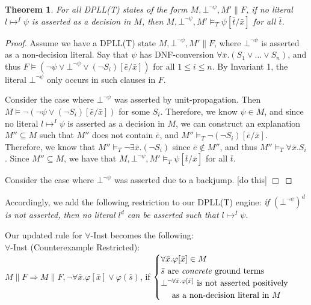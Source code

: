 \documentclass{llncs}
\newtheorem{thm}{Theorem}
\begin{document}
\begin{thm}
For all DPLL(T) states of the form $M, \bot^{\neg \psi}, M' \parallel F$, if no literal $l \mapsto^I \psi$ is asserted as a decision in $M$, then $M, \bot^{\neg \psi}, M' \models_T \psi[\bar{t}/\bar{x}]$ for all $\bar{t}$.
\end{thm}
\begin{proof}
Assume we have a DPLL(T) state $M, \bot^{\neg \psi}, M' \parallel F$, where $\bot^{\neg \psi}$ is asserted as a non-decision literal.
Say that $\psi$ has DNF-conversion $\forall \bar{x}. (S_1 \vee \ldots \vee S_n)$, and thus $F \models ( \neg \psi \vee \bot^{\neg \psi} \vee (\neg S_i)[\bar{e}/\bar{x}])$ for all $1 \leq i \leq n$.
By Invariant 1, the literal $\bot^{\neg \psi}$ only occurs in such clauses in $F$.

Consider the case where $\bot^{\neg \psi}$ was asserted by unit-propagation.
Then $M \models \neg ( \neg \psi \vee (\neg S_i)[\bar{e}/\bar{x}])$ for some $S_i$.
Therefore, we know $\psi \in M$, and since no literal $l \mapsto^I \psi$ is asserted as a decision in $M$, 
we can construct an explanation $M'' \subseteq M$ such that $M''$ does not contain $\bar{e}$, and $M'' \models_T \neg (\neg S_i)[\bar{e}/\bar{x}]$.
Therefore, we know that $M'' \models_T \neg \exists \bar{x}. (\neg S_i)$ since $\bar{e} \not\in M''$, and thus $M'' \models_T \forall \bar{x}. S_i$.
Since $M'' \subseteq M$, we have that $M, \bot^{\neg \psi}, M' \models_T \psi[\bar{t}/\bar{x}]$ for all $\bar{t}$.

Consider the case where $\bot^{\neg \psi}$ was asserted due to a backjump.
[do this] $\Box$
\end{proof}

Accordingly, we add the following restriction to our DPLL(T) engine: \emph{if $(\bot^{\neg \psi})^d$ is not asserted, then no literal $l^d$ can be asserted such that $l \mapsto^I \psi$}.

Our updated rule for $\forall$-Inst becomes the following: \\

\noindent $\forall$-Inst (Counterexample Restricted): \\

$M \parallel F \Longrightarrow M \parallel F, \neg \forall \bar{x}. \varphi[ \bar{ x } ] \vee \varphi( \bar{ s } )$, if   
$\begin{cases}
  \forall \bar{x}. \varphi[ \bar{ x } ] \in M \\
  \bar{ s } \text{ are \emph{concrete} ground terms} \\
  \bot^{\neg \forall \bar{x}. \varphi[ \bar{ x } ]} \text{ is not asserted positively }\\
  \text{ \ \ \ as a non-decision literal in $M$ } \\    
\end{cases}$ \\
\end{document}
